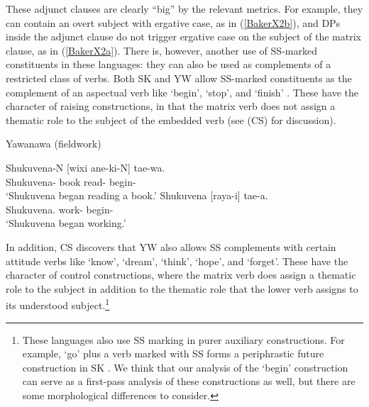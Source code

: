 \documentclass[output=paper]{langscibook}
\begin{document}
These adjunct clauses are clearly “big” by the relevant metrics. For example, they can contain an overt subject with ergative case, as in (\ref{BakerX2b}), and DPs inside the adjunct clause do not trigger ergative case on the subject of the matrix clause, as in (\ref{BakerX2a}). There is, however, another use of SS-marked constituents in these languages: they can also be used as complements of a restricted class of verbs. Both SK and YW allow SS-marked constituents as the complement of an aspectual verb like ‘begin’, ‘stop’, and ‘finish’ \citep[319]{valenzuela2003transitivity}. These have the character of raising constructions, in that the matrix verb does not assign a thematic role to the subject of the embedded verb (see \citealt{camargosouza2020switch} (CS) for discussion).

\begin{exe}
    \ex Yawanawa (fieldwork) \label{BakerX3}
	    \begin{xlist}
			\ex \label{BakerX3a}
			\gll Shukuvena-N [wixi ane-ki-N] tae-wa.\footnotemark\\
			     Shukuvena- book read- begin-\\
			    \glt `Shukuvena began reading a book.'
			\ex \label{BakerX3b}
			\gll Shukuvena [raya-i] tae-a.\\
    			 Shukuvena. work- begin-\\
			    \glt `Shukuvena began working.'
		\end{xlist}
\end{exe}

In addition, CS discovers that YW also allows SS complements with certain attitude verbs like `know', `dream', `think', `hope', and `forget'. These have the character of control constructions, where the matrix verb does assign a thematic role to the subject in addition to the thematic role that the lower verb assigns to its understood subject.\footnote{These languages also use SS marking in purer auxiliary constructions. For example, `go’ plus a verb marked with SS forms a periphrastic future construction in SK \citep[306]{valenzuela2003transitivity, zariquieybiondi2011}. We think that our analysis of the `begin’ construction can serve as a first-pass analysis of these constructions as well, but there are some morphological differences to consider.}
\end{document}

